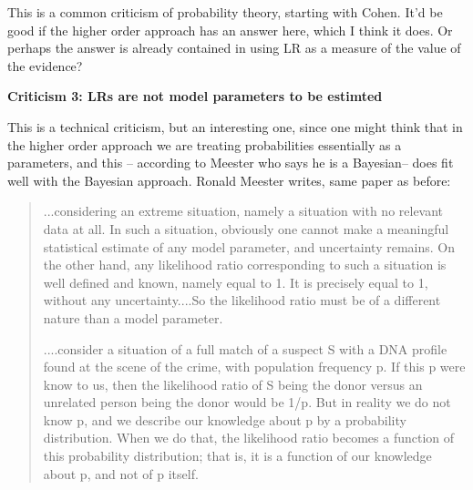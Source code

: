 \documentclass[
  10pt,
  dvipsnames,enabledeprecatedfontcommands]{scrartcl}
\begin{document}
This is a common criticism of probability theory, starting with Cohen.
It'd be good if the higher order approach has an answer here, which I
think it does. Or perhaps the answer is already contained in using LR as
a measure of the value of the evidence?

\textbf{Criticism 3: LRs are not model parameters to be estimted}

This is a technical criticism, but an interesting one, since one might
think that in the higher order approach we are treating probabilities
essentially as a parameters, and this -- according to Meester who says
he is a Bayesian-- does fit well with the Bayesian approach. Ronald
Meester writes, same paper as before:

\begin{quote}
...considering an extreme situation, namely a situation with no relevant data at all. In such a situation, obviously one cannot make a meaningful statistical estimate of any model parameter, and uncertainty remains. On the other hand, any likelihood ratio corresponding to such a situation is well defined and known, namely equal to 1. It is precisely equal to 1, without any uncertainty....So the likelihood ratio must be of a different nature than a model parameter.

....consider a situation of a full match of a suspect S with a DNA profile found at the scene of the crime, with population frequency p. If this p were know to us, then the likelihood ratio of S being the donor versus an unrelated person being the donor would be 1/p. But in reality we do not know p, and we describe our knowledge about p by a probability distribution. When we do that, the likelihood ratio becomes a function of this probability distribution; that is, it is a function of our knowledge about p, and not of p itself.


\end{quote}
\end{document}
